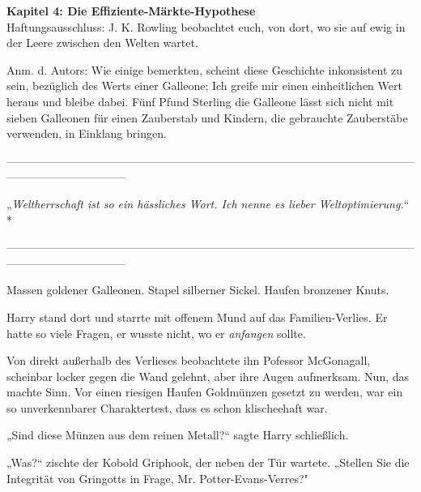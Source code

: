 

\hypertarget{die-effiziente-muxe4rkte-hypothese}{%

\textbf{Kapitel 4: Die Effiziente-Märkte-Hypothese}\\

\hfill\break Haftungsausschluss: J. K. Rowling beobachtet euch, von dort, wo sie auf ewig in der Leere zwischen den Welten wartet.

Anm. d. Autors: Wie einige bemerkten, scheint diese Geschichte inkonsistent zu sein, bezüglich des Werts einer Galleone; Ich greife mir einen einheitlichen Wert heraus und bleibe dabei. Fünf Pfund Sterling die Galleone lässt sich nicht mit sieben Galleonen für einen Zauberstab und Kindern, die gebrauchte Zauberstäbe verwenden, in Einklang bringen.

--------------------------------------------------------------------------------------------------------------------------------------------

\hfill\break

„\emph{Weltherrschaft ist so ein hässliches Wort. Ich nenne es lieber Weltoptimierung.}“ *

\hfill\break

--------------------------------------------------------------------------------------------------------------------------------------------

\hfill\break Massen goldener Galleonen. Stapel silberner Sickel. Haufen bronzener Knuts.

Harry stand dort und starrte mit offenem Mund auf das Familien-Verlies. Er hatte so viele Fragen, er wusste nicht, wo er \emph{anfangen} sollte.

Von direkt außerhalb des Verlieses beobachtete ihn Pofessor McGonagall, scheinbar locker gegen die Wand gelehnt, aber ihre Augen aufmerksam. Nun, das machte Sinn. Vor einen riesigen Haufen Goldmünzen gesetzt zu werden, war ein so unverkennbarer Charaktertest, dass es schon klischeehaft war.

„Sind diese Münzen aus dem reinen Metall?“ sagte Harry schließlich.

„Was?“ zischte der Kobold Griphook, der neben der Tür wartete. „Stellen Sie die Integrität von Gringotts in Frage, Mr. Potter-Evans-Verres?"

}
